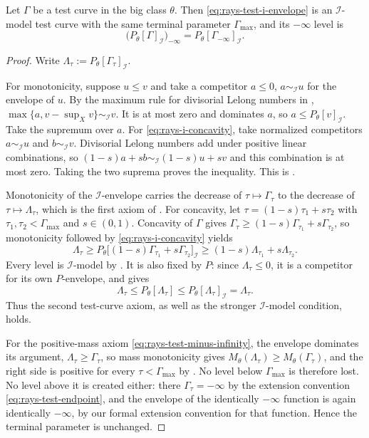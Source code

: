 \begin{lemma}
\label{lem:rays-levelwise-i-envelope}
Let $\Gamma$ be a test curve in the big class $\theta$.  Then
\eqref{eq:rays-test-i-envelope} is an $\mathcal I$-model test curve with
the same terminal parameter $\Gamma_{\max}$, and its $-\infty$ level is
\[
 \bigl(P_\theta[\Gamma]_{\mathcal I}\bigr)_{-\infty}
 =P_\theta[\Gamma_{-\infty}]_{\mathcal I}.
\]
\end{lemma}

\begin{proof}
Write $\Lambda_\tau:=P_\theta[\Gamma_\tau]_{\mathcal I}$.

For monotonicity, suppose $u\leq v$ and take a competitor
$a\leq0$, $a\sim_{\mathcal I}u$ for the envelope of $u$.
By the maximum rule for divisorial Lelong numbers in
,
$\max\{a,v-\sup_Xv\}\sim_{\mathcal I}v$.
It is at most zero and dominates $a$, so
$a\leq P_\theta[v]_{\mathcal I}$.  Take the supremum over $a$.
For \eqref{eq:rays-i-concavity}, take normalized
competitors $a\sim_{\mathcal I}u$ and $b\sim_{\mathcal I}v$.
Divisorial Lelong numbers add under positive linear combinations, so
$(1-s)a+sb\sim_{\mathcal I}(1-s)u+sv$ and this combination is at most
zero.  Taking the two suprema proves the inequality.  This is
\cite[Proposition~3.2.11(1)--(2)]{XiaBook}.

Monotonicity of the $\mathcal I$-envelope carries the decrease of
$\tau\mapsto\Gamma_\tau$ to the decrease of $\tau\mapsto\Lambda_\tau$,
which is the first axiom of .  For concavity, let
$\tau=(1-s)\tau_1+s\tau_2$ with $\tau_1,\tau_2<\Gamma_{\max}$ and
$s\in(0,1)$.  Concavity of $\Gamma$ gives
$\Gamma_\tau\geq(1-s)\Gamma_{\tau_1}+s\Gamma_{\tau_2}$, so monotonicity
followed by \eqref{eq:rays-i-concavity} yields
\[
 \Lambda_\tau
 \geq P_\theta\bigl[(1-s)\Gamma_{\tau_1}+s\Gamma_{\tau_2}\bigr]_{\mathcal I}
 \geq(1-s)\Lambda_{\tau_1}+s\Lambda_{\tau_2}.
\]
Every level is $\mathcal I$-model by
.  It is also fixed by $P$:
since $\Lambda_\tau\leq0$, it is a competitor for its own $P$-envelope,
and  gives
\[
 \Lambda_\tau\leq P_\theta[\Lambda_\tau]
 \leq P_\theta[\Lambda_\tau]_{\mathcal I}=\Lambda_\tau.
\]
Thus the second test-curve axiom, as well as the stronger
$\mathcal I$-model condition, holds.

For the positive-mass axiom \eqref{eq:rays-test-minus-infinity}, the
envelope dominates its argument, $\Lambda_\tau\geq\Gamma_\tau$, so mass
monotonicity gives
$M_\theta(\Lambda_\tau)\geq M_\theta(\Gamma_\tau)$, and the right side is
positive for every $\tau<\Gamma_{\max}$ by
.  No level below $\Gamma_{\max}$ is
therefore lost.  No level above it is created either: there
$\Gamma_\tau=-\infty$ by the extension convention
\eqref{eq:rays-test-endpoint}, and the envelope of the identically
$-\infty$ function is again identically $-\infty$, by our formal
extension convention for that function.  Hence the terminal
parameter is unchanged.


\end{proof}

